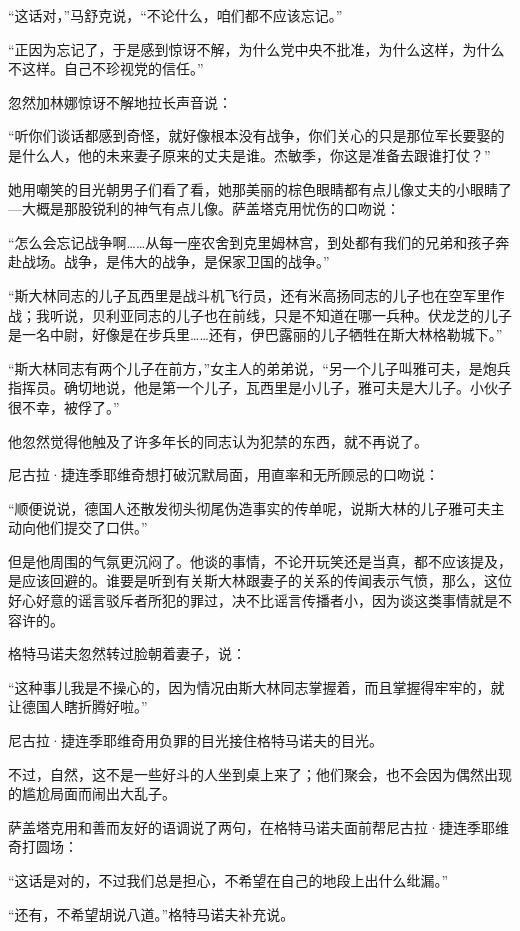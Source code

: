 “这话对，”马舒克说，“不论什么，咱们都不应该忘记。”

“正因为忘记了，于是感到惊讶不解，为什么党中央不批准，为什么这样，为什么不这样。自己不珍视党的信任。”

忽然加林娜惊讶不解地拉长声音说：

“听你们谈话都感到奇怪，就好像根本没有战争，你们关心的只是那位军长要娶的是什么人，他的未来妻子原来的丈夫是谁。杰敏季，你这是准备去跟谁打仗？”

她用嘲笑的目光朝男子们看了看，她那美丽的棕色眼睛都有点儿像丈夫的小眼睛了—大概是那股锐利的神气有点儿像。萨盖塔克用忧伤的口吻说：

“怎么会忘记战争啊……从每一座农舍到克里姆林宫，到处都有我们的兄弟和孩子奔赴战场。战争，是伟大的战争，是保家卫国的战争。”

“斯大林同志的儿子瓦西里是战斗机飞行员，还有米高扬同志的儿子也在空军里作战；我听说，贝利亚同志的儿子也在前线，只是不知道在哪一兵种。伏龙芝的儿子是一名中尉，好像是在步兵里……还有，伊巴露丽的儿子牺牲在斯大林格勒城下。”

“斯大林同志有两个儿子在前方，”女主人的弟弟说，“另一个儿子叫雅可夫，是炮兵指挥员。确切地说，他是第一个儿子，瓦西里是小儿子，雅可夫是大儿子。小伙子很不幸，被俘了。”

他忽然觉得他触及了许多年长的同志认为犯禁的东西，就不再说了。

尼古拉·捷连季耶维奇想打破沉默局面，用直率和无所顾忌的口吻说：

“顺便说说，德国人还散发彻头彻尾伪造事实的传单呢，说斯大林的儿子雅可夫主动向他们提交了口供。”

但是他周围的气氛更沉闷了。他谈的事情，不论开玩笑还是当真，都不应该提及，是应该回避的。谁要是听到有关斯大林跟妻子的关系的传闻表示气愤，那么，这位好心好意的谣言驳斥者所犯的罪过，决不比谣言传播者小，因为谈这类事情就是不容许的。

格特马诺夫忽然转过脸朝着妻子，说：

“这种事儿我是不操心的，因为情况由斯大林同志掌握着，而且掌握得牢牢的，就让德国人瞎折腾好啦。”

尼古拉·捷连季耶维奇用负罪的目光接住格特马诺夫的目光。

不过，自然，这不是一些好斗的人坐到桌上来了；他们聚会，也不会因为偶然出现的尴尬局面而闹出大乱子。

萨盖塔克用和善而友好的语调说了两句，在格特马诺夫面前帮尼古拉·捷连季耶维奇打圆场：

“这话是对的，不过我们总是担心，不希望在自己的地段上出什么纰漏。”

“还有，不希望胡说八道。”格特马诺夫补充说。

